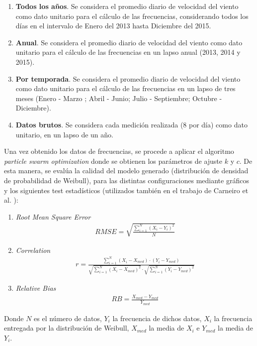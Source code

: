 \begin{enumerate}
	\item \textbf{Todos los años}. Se considera el promedio diario de velocidad del viento como dato unitario para el cálculo de las frecuencias, considerando
	todos los días en el intervalo de Enero del 2013 hasta Diciembre del 2015.
	\item \textbf{Anual}. Se considera el promedio diario de velocidad del viento como dato unitario para el cálculo de las frecuencias en
	un lapso anual (2013, 2014 y 2015).
	\item \textbf{Por temporada}. Se considera el promedio diario de velocidad del viento como dato unitario para el cálculo de las frecuencias en
	un lapso de tres meses (Enero - Marzo ; Abril - Junio; Julio - Septiembre; Octubre - Diciembre).
	\item \textbf{Datos brutos}. Se considera cada medición realizada (8 por día) como dato unitario, en un lapso de un año.
\end{enumerate}

Una vez obtenido los datos de frecuencias, se procede a aplicar el algoritmo \emph{particle swarm optimization} donde se obtienen los parámetros de ajuste $k$ y $c$. De esta manera, se evalúa la calidad del modelo generado (distribución de densidad de probabilidad de Weibull), para las distintas configuraciones mediante gráficos y los siguientes test estadísticos (utilizados también en el trabajo de Carneiro et al. \cite{Carneiro15}):
\begin{enumerate}
    \item \emph{Root Mean Square Error}
        \begin{align}
            RMSE = \sqrt{\frac{\sum_{i=1}^{N}(X_i - Y_i)^2}{N}}
        \end{align}    
    \item \emph{Correlation}
        \begin{align}
            r = \frac{\sum_{i=1}^{N}(X_i - X_{med})\cdot(Y_i - Y_{med})}{\sqrt{\sum_{i=1}^{N}(X_i - X_{med})^2}\cdot\sqrt{\sum_{i=1}^{N}(Y_i - Y_{med})^2}}
        \end{align}    
    \item \emph{Relative Bias}
        \begin{align}
            RB = \frac{X_{med} - Y_{med}}{Y_{med}}  
        \end{align}    
\end{enumerate}        
Donde $N$ es el número de datos, $Y_i$ la frecuencia de dichos datos, $X_i$ la frecuencia entregada por la distribución de Weibull, $X_{med}$ la media de $X_i$ e $Y_{med}$ la media de $Y_i$. \\

